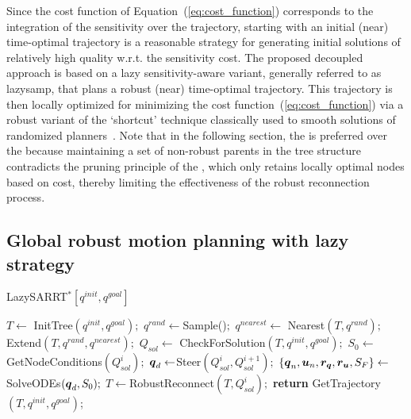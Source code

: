 Since the cost function of Equation~(\ref{eq:cost_function}) corresponds to the integration of the sensitivity over the trajectory, starting with an initial (near) time-optimal trajectory is a reasonable strategy for generating initial solutions of relatively high quality w.r.t. the sensitivity cost.
The proposed decoupled approach is based on a lazy sensitivity-aware variant, generally referred to as \gls{lazysamp}, that plans a robust (near) time-optimal trajectory.
This trajectory is then locally optimized for minimizing the cost function~(\ref{eq:cost_function}) via a robust variant of the `shortcut' technique classically used to smooth solutions of randomized planners~\cite{cShortcut}. 
Note that in the following section, the  is preferred over the  because maintaining a set of non-robust parents in the tree structure contradicts the pruning principle of the , which only retains locally optimal nodes based on cost, thereby limiting the effectiveness of the robust reconnection process.

\subsection{Global robust motion planning with lazy strategy}\label{sec:lazy_rrt*}

\begin{algorithm}[htp]
    \caption{LazySARRT$^* [q^{init}, q^{goal}]$}\label{alg:LazySARRT*}
    \begin{algorithmic}[1]
        \State $T \gets$ InitTree$({q^{init}, q^{goal}});$
            \State $q^{rand} \gets $Sample()$;$
            \State $q^{nearest} \gets$ Nearest$(T,{q^{rand}});$
            \State Extend$(T, q^{rand}, q^{nearest});$
            \State $Q_{sol} \gets$ CheckForSolution$(T, q^{init}, q^{goal});$
                    \State $S_0 \gets $GetNodeConditions$(Q_{sol}^{i});$
                    \State $\boldsymbol{q}_d \gets $Steer$(Q_{sol}^{i}, Q_{sol}^{i+1});$
                    \State $\left \{\boldsymbol{q}_n, \boldsymbol{u}_n, \boldsymbol{r_q}, \boldsymbol{r_u}, S_F \right \}  \gets $SolveODEs$(\boldsymbol{q}_d, S_0);$
                        \State $T \gets $RobustReconnect$(T, Q_{sol}^{i});$
                    \EndIf
                \EndFor
            \EndIf
        \EndWhile
        \State \textbf{return} GetTrajectory$(T, q^{init}, q^{goal})$;
    \end{algorithmic}
\end{algorithm}

